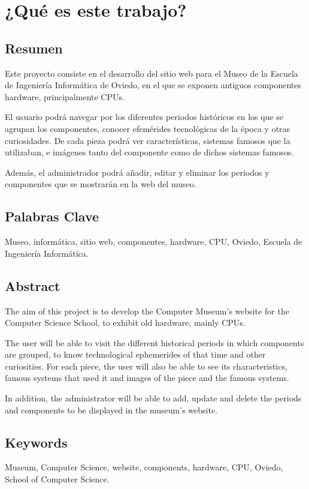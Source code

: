 \newpage
\hypersetup{pageanchor=true}

\newpage
\thispagestyle{empty}
\chapter{¿Qué es este trabajo?}
\section{Resumen}
Este proyecto consiste en el desarrollo del sitio web para el Museo de la Escuela de Ingeniería Informática de Oviedo, en el que se exponen antiguos componentes hardware, principalmente CPUs.\\
\par
El usuario podrá navegar por los diferentes periodos históricos en los que se agrupan los componentes, conocer efemérides tecnológicas de la época y otras curiosidades. De cada pieza podrá ver características, sistemas famosos que la utilizaban, e imágenes tanto del componente como de dichos sistemas famosos.\\
\par
Además, el administrador podrá añadir, editar y eliminar los periodos y componentes que se mostrarán en la web del museo.
\newpage
\section{Palabras Clave}
Museo, informática, sitio web, componentes, hardware, CPU, Oviedo, Escuela de Ingeniería Informática.
\pagestyle{fancy}
\newpage
\section{Abstract}
The aim of this project is to develop the Computer Museum's website for the Computer Science School, to exhibit old hardware, mainly CPUs.\\
\par
The user will be able to visit the different historical periods  in which components are grouped, to know technological ephemerides of that time and other curiosities. For each piece, the user will also be able to see its characteristics, famous systems that used it and images of the piece and the famous systems.\\
\par
In addition, the administrator will be able to add, update and delete the periods and components to be displayed in the museum's website.
\pagestyle{fancy}
\newpage
\section{Keywords}
Museum, Computer Science, website, components, hardware, CPU, Oviedo, School of Computer Science.